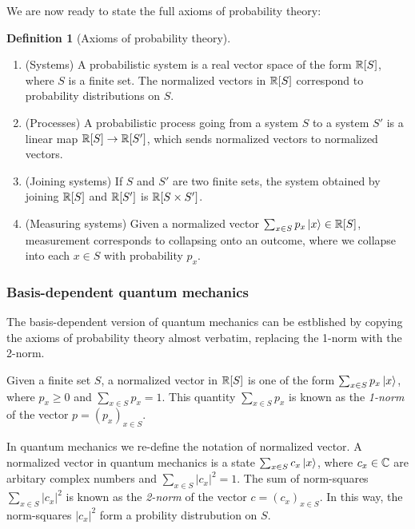 \documentclass{article}
\theoremstyle{definition}
\newtheorem*{definition}{Definition}
\numberwithin{figure}{section}
\begin{document}
We are now ready to state the full axioms of probability theory:

\begin{definition}[Axioms of probability theory] $\,$

\begin{enumerate}
\item (Systems) A probabilistic system is a real vector space of the form $\mathbb{R}[S]$, where $S$ is a finite set. The normalized vectors in $\mathbb{R}[S]$ correspond to probability distributions on $S$.
\item (Processes) A probabilistic process going from a system $S$ to a system $S'$ is a linear map $\mathbb{R}[S]\to \mathbb{R}[S']$, which sends normalized vectors to normalized vectors.
\item (Joining systems) If $S$ and $S'$ are two finite sets, the system obtained by joining $\mathbb{R}[S]$ and $\mathbb{R}[S']$ is $\mathbb{R}[S\times S']$.
\item (Measuring systems) Given a normalized vector $\sum_{x\in S}p_x \left |x\right>\in \mathbb{R}[S]$, measurement corresponds to collapsing onto an outcome, where we collapse into each $x\in S$ with probability $p_x$.
\end{enumerate}

\raggedleft\qedsymbol{}
\end{definition}

\subsubsection{Basis-dependent quantum mechanics}

The basis-dependent version of quantum mechanics can be estblished by copying the axioms of probability theory almost verbatim, replacing the 1-norm with the 2-norm.

Given a finite set $S$, a normalized vector in $\mathbb{R}[S]$ is one of the form $\sum_{x\in S}p_x \ket{x}$, where $p_x\geq 0$ and $\sum_{x\in S}p_x=1$.  This quantity $\sum_{x\in S}p_x$ is known as the \textit{1-norm} of the vector $p=(p_x)_{x\in S}$.

In quantum mechanics we re-define the notation of normalized vector. A normalized vector in quantum mechanics is a state $\sum_{x\in S}c_x \ket{x}$, where $c_x\in \mathbb{C}$ are arbitary complex numbers and $\sum_{x\in S}|c_x|^2=1$. The sum of norm-squares $\sum_{x\in S}|c_x|^2$ is known as the \textit{2-norm} of the vector $c=(c_x)_{x\in S}$. In this way, the norm-squares $|c_x|^2$ form a probility distrubution on $S$.
\end{document}

